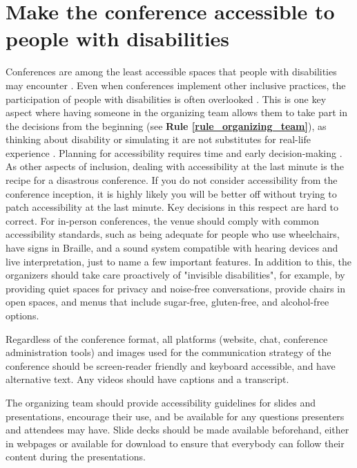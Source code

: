 \documentclass[10pt,letterpaper]{article}
\begin{document}
\section{Make the conference accessible to people with disabilities}
\label{rule_accessibility}


Conferences are among the least accessible spaces that people with disabilities may encounter \cite{priceAccessImaginedConstruction2009}. Even when conferences implement other inclusive practices, the participation of people with disabilities is often overlooked \cite{marks2021meeting}. This is one key aspect where having someone in the organizing team allows them to take part in the decisions from the beginning (see \textbf{Rule \ref{rule_organizing_team}}), as thinking about disability or simulating it are not substitutes for real-life experience \cite{costanzachockDesign2020}. Planning for accessibility requires time and early decision-making \cite{irishIncreasingParticipationUsing2020}. As other aspects of inclusion, dealing with accessibility at the last minute is the recipe for a disastrous conference. If you do not consider accessibility from the conference inception, it is highly likely you will be better off without trying to patch accessibility at the last minute. Key decisions in this respect are hard to correct. 
For in-person conferences, the venue should comply with common accessibility standards, such as being adequate for people who use wheelchairs, have signs in Braille, and a sound system compatible with hearing devices and live interpretation, just to name a few important features. In addition to this, the organizers should take care proactively of "invisible disabilities", for example, by providing quiet spaces for privacy and noise-free conversations, provide chairs in open spaces, and menus that include sugar-free, gluten-free, and alcohol-free options.

Regardless of the conference format, all platforms (website, chat, conference administration tools) and images used for the communication strategy of the conference should be screen-reader friendly and keyboard accessible, and have alternative text. Any videos should have captions and a transcript. 

The organizing team should provide accessibility guidelines for slides and presentations, encourage their use, and be available for any questions presenters and attendees may have. Slide decks should be made available beforehand, either in webpages or available for download to ensure that everybody can follow their content during the presentations. 
\end{document}

